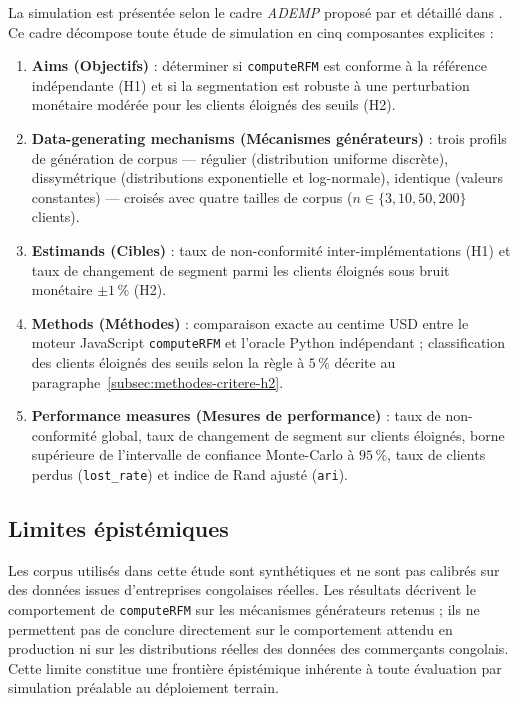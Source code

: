 La simulation est présentée selon le cadre \emph{ADEMP} proposé par \citet{Morris2019} et
détaillé dans \citet{Morris2019slides}. Ce cadre décompose toute étude de simulation en cinq
composantes explicites :

\begin{enumerate}
  \item \textbf{Aims (Objectifs)} : déterminer si \texttt{computeRFM} est conforme à la
    référence indépendante (H1) et si la segmentation est robuste à une perturbation
    monétaire modérée pour les clients éloignés des seuils (H2).
  \item \textbf{Data-generating mechanisms (Mécanismes générateurs)} : trois profils de
    génération de corpus — régulier (distribution uniforme discrète), dissymétrique
    (distributions exponentielle et log-normale), identique (valeurs constantes) — croisés
    avec quatre tailles de corpus ($n \in \{3, 10, 50, 200\}$ clients).
  \item \textbf{Estimands (Cibles)} : taux de non-conformité inter-implémentations (H1) et
    taux de changement de segment parmi les clients éloignés sous bruit monétaire $\pm1\,\%$
    (H2).
  \item \textbf{Methods (Méthodes)} : comparaison exacte au centime USD entre le moteur
    JavaScript \texttt{computeRFM} et l'oracle Python indépendant ; classification des
    clients éloignés des seuils selon la règle à $5\,\%$ décrite au
    paragraphe~\ref{subsec:methodes-critere-h2}.
  \item \textbf{Performance measures (Mesures de performance)} : taux de non-conformité
    global, taux de changement de segment sur clients éloignés, borne supérieure de
    l'intervalle de confiance Monte-Carlo à $95\,\%$, taux de clients perdus
    (\texttt{lost\_rate}) et indice de Rand ajusté (\texttt{ari}).
\end{enumerate}

\subsection{Limites épistémiques}
\label{subsec:methodes-limites-epistemiques}

Les corpus utilisés dans cette étude sont synthétiques et ne sont pas calibrés sur des
données issues d'entreprises congolaises réelles. Les résultats décrivent le comportement
de \texttt{computeRFM} sur les mécanismes générateurs retenus ; ils ne permettent pas de
conclure directement sur le comportement attendu en production ni sur les distributions
réelles des données des commerçants congolais. Cette limite constitue une frontière
épistémique inhérente à toute évaluation par simulation préalable au déploiement terrain.


